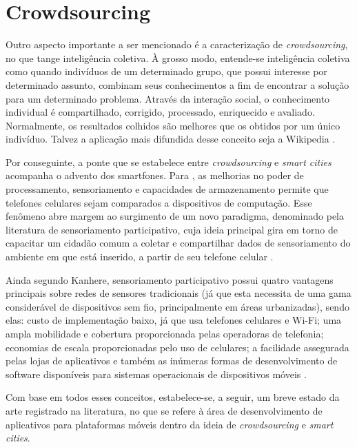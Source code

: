 
\section{Crowdsourcing}

Outro aspecto importante  a ser mencionado é a caracterização de \emph{crowdsourcing}, no que tange inteligência coletiva. À grosso modo, entende-se inteligência coletiva como quando indivíduos de um determinado grupo, que possui interesse por determinado assunto, combinam seus conhecimentos a fim de encontrar a solução para um determinado problema.  Através da interação social, o conhecimento individual é compartilhado, corrigido, processado, enriquecido e avaliado. Normalmente, os resultados colhidos são melhores que os obtidos por um único indivíduo. Talvez a aplicação mais difundida desse conceito seja a Wikipedia  \cite{schuurman}. 

Por conseguinte, a ponte que se estabelece entre \emph{crowdsourcing} e \emph{smart cities} acompanha o advento dos smartfones. Para , as melhorias no poder de processamento, sensoriamento e capacidades de armazenamento permite que telefones celulares sejam comparados a dispositivos de computação. Esse fenômeno abre margem ao surgimento de um novo paradigma, denominado pela literatura de sensoriamento participativo, cuja ideia principal gira em torno de capacitar um cidadão comum a coletar e compartilhar dados de sensoriamento do ambiente em que está inserido, a partir de seu telefone celular \cite{kanhere}.

Ainda segundo Kanhere, sensoriamento participativo possui quatro vantagens principais sobre redes de sensores tradicionais (já que esta necessita de uma gama considerável de dispositivos sem fio, principalmente em áreas urbanizadas), sendo elas: custo de implementação baixo, já que usa telefones celulares e Wi-Fi; uma ampla mobilidade e cobertura proporcionada pelas operadoras de telefonia; economias de escala proporcionadas pelo uso de celulares; a facilidade assegurada pelas lojas de aplicativos e também as inúmeras formas de desenvolvimento de software disponíveis para sistemas operacionais de dispositivos móveis \cite{kanhere}. 

Com base em todos esses conceitos, estabelece-se, a seguir, um breve estado da arte registrado na literatura, no que se refere à área de desenvolvimento de aplicativos para plataformas móveis dentro da ideia de \emph{crowdsourcing} e \emph{smart cities}.

